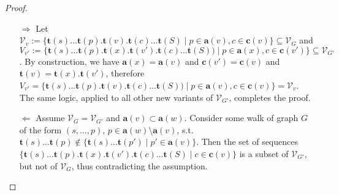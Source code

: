 \documentclass[a4paper]{article}
\newtheorem{conjecture}{Conjecture}
\newcommand{\prefix}{\mathbf{p}}
\newcommand{\parent}{\mathbf{a}}
\newcommand{\child}{\mathbf{c}}
\newcommand{\seq}{\mathbf{t}}
\begin{document}
\begin{proof}
    \begin{enumerate}
        \item[$\Rightarrow$] Let $\mathcal V_v := 
            \{\seq(s)\ldots\seq(p).\seq(v).\seq(c)\ldots\seq(S) \mid p \in
            \parent(v), c \in \child(v) \} \subseteq \mathcal V_{G}$ and 
            $V_{v'} :=
            \{\seq(s)\ldots\seq(p).\seq(x).\seq(v').\seq(c)\ldots\seq(S)) \mid
            p \in \parent(x), c \in \child(v') \}\subseteq \mathcal V_{G'}$.
            By construction, we have $\parent(x) = \parent(v)$ and $\child(v')
            = \child(v)$ and $\seq(v) = \seq(x).\seq(v')$, therefore $V_{v'} =
            \{\seq(s)\ldots\seq(p).\seq(v).\seq(c)\ldots\seq(S)) \mid p \in
            \parent(v), c \in \child(v) \} = \mathcal V_v$. The same logic,
            applied to all other new variants of $\mathcal V_{G'}$, completes
            the proof. 

    \item[$\Leftarrow$] Assume $\mathcal V_G = \mathcal V_{G'}$ and $\parent(v)
        \subset \parent(w)$. Consider some walk of graph $G$ of the form $(s,
        \ldots, p)$, $p \in \parent(w) \setminus \parent(v)$, s.t.
        $\seq(s)\ldots\seq(p) \not\in \{\seq(s)\ldots\seq(p') \mid p' \in
        \parent(v)\}$. Then the set of sequences
        $\{\seq(s)\ldots\seq(p).\seq(x).\seq(v').\seq(c)\ldots\seq(S) \mid c
        \in \child(v)\}$ is a subset of $\mathcal V_{G'}$, but not of $\mathcal
        V_{G}$, thus contradicting the assumption. 
    \end{enumerate}
\end{proof}




\end{document}

